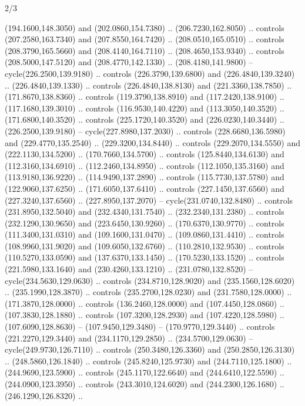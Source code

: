 \begin{flagdescription}{2/3}
\begin{scope}[xshift=0.5\flaglength,yshift=0.5\flagwidth,scale=\stretchfactor]
\begin{scope}[scale=0.001645\flagwidth,yshift=65mm,xshift=-63mm]
\begin{scope}[y=0.80pt, x=0.80pt, yscale=-1,]
\begin{scope}[cm={{1.33333,0.0,0.0,1.33333,(0.0,1e-05)}}]
  (194.1600,148.3050) and (202.0860,154.7380) .. (206.7230,162.8050) .. controls
  (207.2580,163.7340) and (207.8550,164.7420) .. (208.0510,165.0510) .. controls
  (208.3790,165.5660) and (208.4140,164.7110) .. (208.4650,153.9340) .. controls
  (208.5000,147.5120) and (208.4770,142.1330) .. (208.4180,141.9800) --
  cycle(226.2500,139.9180) .. controls (226.3790,139.6800) and
  (226.4840,139.3240) .. (226.4840,139.1330) .. controls (226.4840,138.8130) and
  (221.3360,138.7850) .. (171.8670,138.8360) .. controls (119.3790,138.8910) and
  (117.2420,138.9100) .. (117.1680,139.3010) .. controls (116.9530,140.4220) and
  (113.3050,140.3520) .. (171.6800,140.3520) .. controls (225.1720,140.3520) and
  (226.0230,140.3440) .. (226.2500,139.9180) -- cycle(227.8980,137.2030) ..
  controls (228.6680,136.5980) and (229.4770,135.2540) .. (229.3200,134.8440) ..
  controls (229.2070,134.5550) and (222.1130,134.5200) .. (170.7660,134.5700) ..
  controls (125.8440,134.6130) and (112.3160,134.6910) .. (112.2460,134.8950) ..
  controls (112.1050,135.3160) and (113.9180,136.9220) .. (114.9490,137.2890) ..
  controls (115.7730,137.5780) and (122.9060,137.6250) .. (171.6050,137.6410) ..
  controls (227.1450,137.6560) and (227.3240,137.6560) .. (227.8950,137.2070) --
  cycle(231.0740,132.8480) .. controls (231.8950,132.5040) and
  (232.4340,131.7540) .. (232.2340,131.2380) .. controls (232.1290,130.9650) and
  (223.6450,130.9260) .. (170.6370,130.9770) .. controls (111.3400,131.0310) and
  (109.1600,131.0470) .. (109.0860,131.4410) .. controls (108.9960,131.9020) and
  (109.6050,132.6760) .. (110.2810,132.9530) .. controls (110.5270,133.0590) and
  (137.6370,133.1450) .. (170.5230,133.1520) .. controls (221.5980,133.1640) and
  (230.4260,133.1210) .. (231.0780,132.8520) -- cycle(234.5630,129.0630) ..
  controls (234.8710,128.9020) and (235.1560,128.6020) .. (235.1990,128.3870) ..
  controls (235.2700,128.0230) and (231.7580,128.0000) .. (171.3870,128.0000) ..
  controls (136.2460,128.0000) and (107.4450,128.0860) .. (107.3830,128.1880) ..
  controls (107.3200,128.2930) and (107.4220,128.5980) .. (107.6090,128.8630) --
  (107.9450,129.3480) -- (170.9770,129.3440) .. controls (221.2270,129.3440) and
  (234.1170,129.2850) .. (234.5700,129.0630) -- cycle(249.9730,126.7110) ..
  controls (250.3480,126.3360) and (250.2850,126.3130) .. (248.5860,126.1840) ..
  controls (245.8240,125.9730) and (244.7110,125.1800) .. (244.9690,123.5900) ..
  controls (245.1170,122.6640) and (244.6410,122.5590) .. (244.0900,123.3950) ..
  controls (243.3010,124.6020) and (244.2300,126.1680) .. (246.1290,126.8320) ..

\end{scope}
\end{scope}
\end{scope}
\end{scope}
\end{flagdescription}
